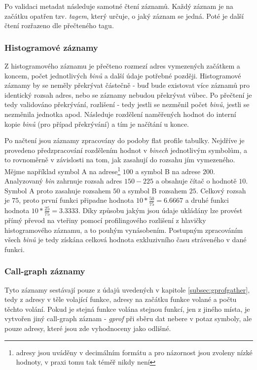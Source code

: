 \documentclass[czech,BP]{thesiskiv}
\begin{document}
Po validaci metadat následuje samotné čtení záznamů. Každý záznam je na začátku opatřen tzv. \emph{tagem}, který určuje, o jaký záznam se jedná. Poté je další čtení rozřazeno dle přečteného tagu.

\subsubsection*{Histogramové záznamy}

Z histogramového záznamu je přečteno rozmezí adres vymezených začátkem a koncem, počet jednotlivých \emph{binů} a další údaje potřebné později. Histogramové záznamy by se neměly překrývat částečně - buď bude existovat více záznamů pro identický rozsah adres, nebo se záznamy nebudou překrývat vůbec. Po přečtení je tedy validováno překrývání, rozlišení - tedy jestli se nezměnil počet \emph{binů}, jestli se nezměnila jednotka apod. Následuje rozdělení naměřených hodnot do interní kopie \emph{binů} (pro případ překrývání) a tím je načítání u konce.

Po načtení jsou záznamy zpracovány do podoby flat profile tabulky. Nejdříve je provedeno předzpracování rozdělením hodnot v \emph{binech} jednotlivým symbolům, a to rovnoměrně v závislosti na tom, jak zasahují do rozsahu jím vymezeného. Mějme například symbol A na adrese\footnote{adresy jsou uváděny v decimálním formátu a pro názornost jsou zvoleny nízké hodnoty, v praxi tomu tak téměř nikdy není} $100$ a symbol B na adrese $200$. Analyzovaný \emph{bin} zahrnuje rozsah adres $150 - 225$ a obsahuje čítač o hodnotě $10$. Symbol A proto zasahuje rozsahem $50$ a symbol B rozsahem $25$. Celkový rozsah je $75$, proto první funkci připadne hodnota $10*\frac{50}{75}=6.6667$ a druhé funkci hodnota $10*\frac{25}{75}=3.3333$. Díky způsobu jakým jsou údaje ukládány lze provést přímý převod na vteřiny pomocí profilingového rozlišení z hlavičky histogramového záznamu, a to pouhým vynásobením. Postupným zpracováním všech \emph{binů} je tedy získána celková hodnota exkluzivního času stráveného v dané funkci.

\subsubsection*{Call-graph záznamy}

Tyto záznamy sestávají pouze z údajů uvedených v kapitole \ref{subsec:gprofgather}, tedy z adresy v těle volající funkce, adresy na začátku funkce volané a počtu těchto volání. Pokud je stejná funkce volána stejnou funkcí, jen z jiného místa, je vytvořen jiný call-graph záznam - \emph{gprof} při sběru dat nebere v potaz symboly, ale pouze adresy, které jsou zde vyhodnoceny jako odlišné.
\end{document}
